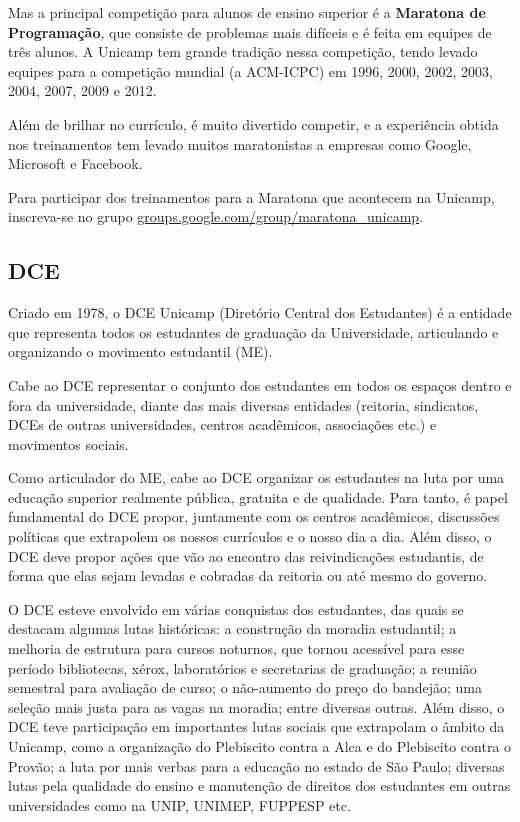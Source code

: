 Mas a principal competição para alunos de ensino superior é a
\textbf{Maratona de Programação}, que consiste de problemas mais difíceis e é
feita em equipes de três alunos. A Unicamp tem grande tradição nessa competição,
tendo levado equipes para a competição mundial (a ACM-ICPC) em 1996, 2000, 2002,
2003, 2004, 2007, 2009 e 2012.

Além de brilhar no currículo, é muito divertido competir, e a experiência obtida
nos treinamentos tem levado muitos maratonistas a empresas como Google,
Microsoft e Facebook.

Para participar dos treinamentos para a Maratona que acontecem na Unicamp,
inscreva-se no grupo \url{groups.google.com/group/maratona_unicamp}.

\subsection{DCE}

Criado em 1978, o DCE Unicamp (Diretório Central dos Estudantes) é a entidade que
representa todos os estudantes de graduação da Universidade, articulando
e organizando o movimento estudantil (ME).

Cabe ao DCE representar o conjunto dos
estudantes em todos os espaços dentro e fora da universidade, diante das mais
diversas entidades (reitoria, sindicatos, DCEs de outras universidades, centros
acadêmicos, associações etc.) e movimentos sociais.

Como articulador do ME, cabe ao DCE organizar os estudantes na luta por uma
educação superior realmente pública, gratuita e de qualidade. Para tanto,
é papel fundamental do DCE propor, juntamente com os centros acadêmicos,
discussões políticas que extrapolem os nossos currículos e o nosso dia a dia.
Além disso, o DCE deve propor ações que vão ao encontro das reivindicações
estudantis, de forma que elas sejam levadas e cobradas da reitoria ou até mesmo
do governo.

O DCE esteve envolvido em várias conquistas dos estudantes, das quais se
destacam algumas lutas históricas: a construção da moradia estudantil; a melhoria
de estrutura para cursos noturnos, que tornou acessível para esse período
bibliotecas, xérox, laboratórios e secretarias de graduação; a reunião semestral
para avaliação de curso; o não-aumento do preço do bandejão; uma seleção mais
justa para as vagas na moradia; entre diversas outras. Além disso, o DCE teve
participação em importantes lutas sociais que extrapolam o âmbito da Unicamp,
como a organização do Plebiscito contra a Alca e do Plebiscito contra o Provão;
a luta por mais verbas para a educação no estado de São Paulo; diversas lutas
pela qualidade do ensino e manutenção de direitos dos estudantes em outras
universidades como na UNIP, UNIMEP, FUPPESP etc.

